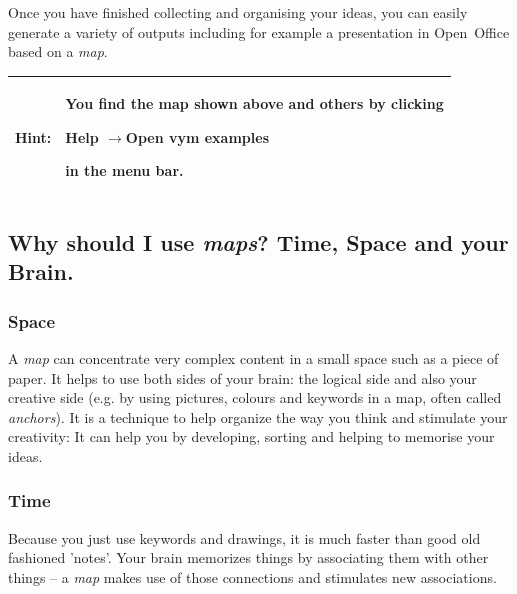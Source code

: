 \documentclass[12pt,a4paper]{article}
\newcommand{\hint}[1]{
    \begin{center} 
        \begin{tabular}{|rp{12cm}|} \hline
            {\bf Hint}:& #1\\   \hline
        \end{tabular}
            \marginpar{\Huge !} 
    \end{center} 
}
\newcommand{\ra}{$\longrightarrow$}
\begin{document}
Once you have finished collecting and organising your ideas, you can
easily generate a variety of outputs including for example a
presentation in Open~Office based on a {\em map}.

\hint{You find the map shown above and others by clicking
\begin{center}Help \ra Open vym examples\end{center} in the menu bar.}

\subsection{Why should I use {\em maps}? Time, Space and your Brain.}
\subsubsection*{Space}
A {\em map} can concentrate very complex content in a small space such
as a piece of paper. It helps to use both sides of your brain: the
logical side and also your creative side (e.g. by using pictures,
colours and keywords in a map, often called {\em anchors}).  It is a
technique to help organize the way you think and stimulate your
creativity: It can help you by developing, sorting and helping to
memorise your ideas. 

\subsubsection*{Time}
Because you just use keywords and drawings, it is much faster than good
old fashioned 'notes'. Your brain memorizes things by associating them
with other things -- a {\em map} makes use of those connections and
stimulates new associations. 
\end{document}

